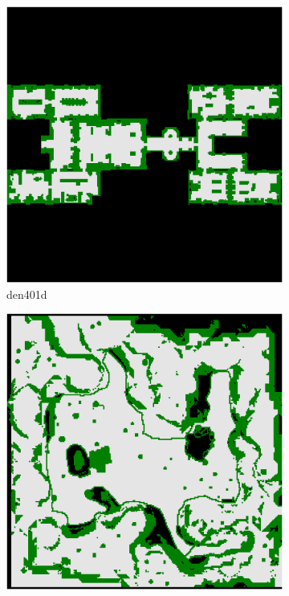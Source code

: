 \documentclass[11pt]{article}
\begin{document}
\begin{figure}
\begin{subfigure}[b]{0.24\textwidth}
            \includegraphics[width=\textwidth]{../maps/den401d}
            \caption{den401d}
        \end{subfigure}
        \hfill
        \begin{subfigure}[b]{0.24\textwidth}
            \centering
            \includegraphics[width=\textwidth]{../maps/brc504d}

\end{subfigure}
\end{figure}
\end{document}
